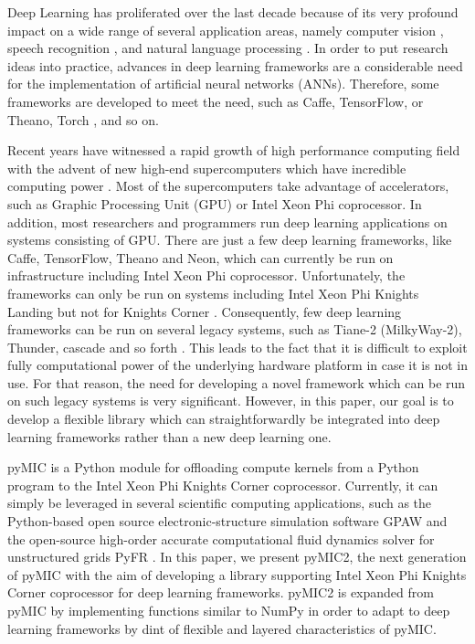 \label{intro}
Deep Learning has proliferated over the last decade because of its very profound impact on a wide range of several application areas, namely computer vision \cite{krizhevsky2012imagenet,russakovsky2015imagenet}, speech recognition \cite{ding2014theano,hannun2014deep}, and natural language processing \cite{collobert2011natural}. In order to put research ideas into practice, advances in deep learning frameworks are a considerable need for the implementation of artificial neural networks (ANNs). Therefore, some frameworks are developed to meet the need, such as Caffe\cite{caffe}, TensorFlow\cite{tensorflow}, or Theano\cite{theano}, Torch \cite{torch}, and so on. 

Recent years have witnessed a rapid growth of high performance computing field with the advent of new high-end supercomputers which have incredible computing power \cite{top500}. Most of the supercomputers take advantage of accelerators, such as Graphic Processing Unit (GPU) or Intel Xeon Phi coprocessor. In addition, most researchers and programmers run deep learning applications on systems consisting of GPU. There are just a few deep learning frameworks, like Caffe, TensorFlow, Theano and Neon, which can currently be run on infrastructure including Intel Xeon Phi coprocessor. Unfortunately, the frameworks can only be run on systems including Intel Xeon Phi Knights Landing but not for Knights Corner \cite{deep-frame-mic}. Consequently, few deep learning frameworks can be run on several legacy systems, such as Tiane-2 (MilkyWay-2), Thunder, cascade and so forth \cite{top500}. This leads to the fact that it is difficult to exploit fully computational power of the underlying hardware platform in case it is not in use. For that reason, the need for developing a novel framework which can be run on such legacy systems is very significant. However, in this paper, our goal is to develop a flexible library which can straightforwardly be integrated into deep learning frameworks rather than a new deep learning one.

pyMIC \cite{pymic,klemm2014pymic} is a Python module for offloading compute kernels from a Python program to the Intel Xeon Phi Knights Corner coprocessor. Currently, it can simply be leveraged in several scientific computing applications, such as the Python-based open source electronic-structure simulation software GPAW \cite{klemm2014pymic} and the open-source high-order accurate computational fluid dynamics solver for unstructured grids PyFR \cite{klemm2016using}. In this paper, we present pyMIC2, the next generation of pyMIC with the aim of developing a library supporting Intel Xeon Phi Knights Corner coprocessor for deep learning frameworks. pyMIC2 is expanded from pyMIC by implementing functions similar to NumPy \cite{Numpy} in order to adapt to deep learning frameworks by dint of flexible and layered characteristics of pyMIC. 

